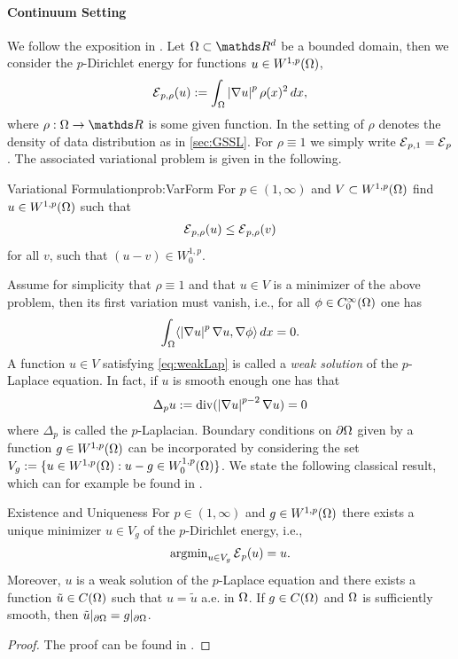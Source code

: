\paragraph{Continuum Setting}
We follow the exposition in \cite{lindqvist2017notes}. Let $\domain\subset\R^d$ be a bounded domain, then we consider the $p$-Dirichlet energy for functions $u\in W^{1,p}(\Omega)$,
%
\begin{align}\label{eq:DirichletEnergy}
	\mathcal{E}{}_{p,\rho}(u) := \int_\Omega \left|\nabla u\right|^p \rho(x)^2 \, dx,
\end{align}
%
%
where $\rho:\domain\to\R$ is some given function. In the setting of \cite{GarcSlep15, slepcev2019analysis} $\rho$ denotes the density of data distribution as in \cref{sec:GSSL}. For $\rho\equiv1$ we simply write $\mathcal{E}{}_{p,1}=\mathcal{E}{}_{p}$. The associated variational problem is given in the following.
%
\begin{problem}{Variational Formulation}{prob:VarForm}
	For $p\in (1,\infty)$ and $V\subset W^{1,p}(\Omega)$ find $u\in W^{1,p}(\Omega)$ such that
	\begin{align*}
		\mathcal{E}{}_{p,\rho}(u) \leq \mathcal{E}{}_{p,\rho}(v)
	\end{align*}
	for all $v$, such that $(u-v)\in W^{1,p}_0$.
\end{problem}
%
\noindent%
Assume for simplicity that $\rho\equiv 1$ and that $u\in V$ is a minimizer of the above problem, then its first variation must vanish, i.e., for all $\phi\in C^\infty_0(\Omega)$ one has
%
\begin{align}\label{eq:weakLap}
	\int_\Omega \langle \left|\nabla u\right|^p \nabla u, \nabla \phi \rangle \, dx = 0.
\end{align}
%
A function $u\in V$ satisfying \cref{eq:weakLap} is called a \emph{weak solution} of the $p$-Laplace equation. In fact, if $u$ 
is smooth enough one has that
%
\begin{align}\label{eq:strongLap}
	\Delta_p u := \operatorname{div}(\left|\nabla u\right|^{p-2} \nabla u) = 0
\end{align}
%
where $\Delta_p$ is called the $p$-Laplacian. Boundary conditions on $\partial \Omega$ given by a function $g\in W^{1,p}(\Omega)$  can be incorporated by considering the set
$V_g := \{u\in W^{1,p}(\Omega): u-g \in W^{1,p}_0(\Omega)\}$. 
We state the following classical result, which can for example be found in \cite{lindqvist2017notes}.
%
\begin{theorem}{Existence and Uniqueness}{}
	For $p\in (1,\infty)$ and $g\in W^{1,p}(\Omega)$ there exists a unique minimizer $u\in V_g$ of the $p$-Dirichlet energy, i.e.,
	\begin{align*}
		\operatorname{argmin}_{u\in V_g} \mathcal{E}{}_p(u) = u.
	\end{align*}
	Moreover, $u$ is a weak solution of the $p$-Laplace equation and there exists a function $\tilde{u}\in C(\Omega)$ such that
	$u = \tilde{u}$ a.e. in $\Omega$. If $g\in C(\Omega)$ and $\Omega$ is sufficiently smooth, then 
	$\tilde{u}\vert_{\partial \Omega} = g\vert_{\partial \Omega}$.
\end{theorem}
%
%
\begin{proof}
	The proof can be found in \cite[Thm. 2.16]{lindqvist2017notes}.
\end{proof}
%
%
